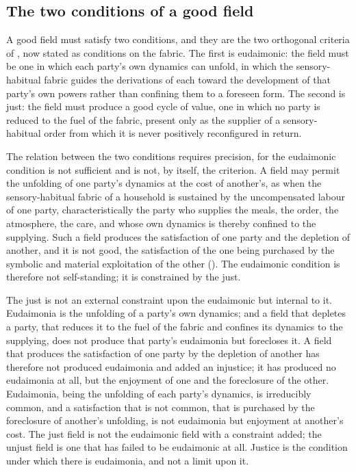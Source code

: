 \subsection{The two conditions of a good field}
\label{p10:sec:fm-conditions}

A good field must satisfy two conditions, and they are the two orthogonal criteria of , now stated as conditions on the fabric. The first is eudaimonic: the field must be one in which each party's own dynamics can unfold, in which the sensory-habitual fabric guides the derivations of each toward the development of that party's own powers rather than confining them to a foreseen form. The second is just: the field must produce a good cycle of value, one in which no party is reduced to the fuel of the fabric, present only as the supplier of a sensory-habitual order from which it is never positively reconfigured in return.

The relation between the two conditions requires precision, for the eudaimonic condition is not sufficient and is not, by itself, the criterion. A field may permit the unfolding of one party's dynamics at the cost of another's, as when the sensory-habitual fabric of a household is sustained by the uncompensated labour of one party, characteristically the party who supplies the meals, the order, the atmosphere, the care, and whose own dynamics is thereby confined to the supplying. Such a field produces the satisfaction of one party and the depletion of another, and it is not good, the satisfaction of the one being purchased by the symbolic and material exploitation of the other (). The eudaimonic condition is therefore not self-standing; it is constrained by the just.

\begin{claim}
The just is not an external constraint upon the eudaimonic but internal to it. Eudaimonia is the unfolding of a party's own dynamics; and a field that depletes a party, that reduces it to the fuel of the fabric and confines its dynamics to the supplying, does not produce that party's eudaimonia but forecloses it. A field that produces the satisfaction of one party by the depletion of another has therefore not produced eudaimonia and added an injustice; it has produced no eudaimonia at all, but the enjoyment of one and the foreclosure of the other. Eudaimonia, being the unfolding of each party's dynamics, is irreducibly common, and a satisfaction that is not common, that is purchased by the foreclosure of another's unfolding, is not eudaimonia but enjoyment at another's cost. The just field is not the eudaimonic field with a constraint added; the unjust field is one that has failed to be eudaimonic at all. Justice is the condition under which there is eudaimonia, and not a limit upon it.
\end{claim}


